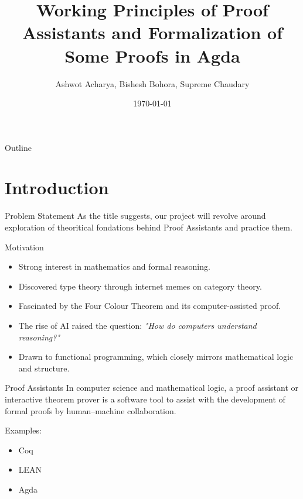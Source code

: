 \documentclass{beamer}
\title{Working Principles of Proof Assistants and Formalization of Some Proofs in Agda}
\author{Ashwot Acharya, Bishesh Bohora, Supreme Chaudary}
\institute{Kathmandu University}
\date{\today}
\begin{document}
\begin{frame}
  \titlepage
\end{frame}

\begin{frame}{Outline}
  \tableofcontents
\end{frame}

\section{Introduction}

\begin{frame}{Problem Statement}
    As the title suggests, our project will revolve around exploration of theoritical fondations behind Proof Assistants and practice them.

    
\end{frame}
\begin{frame}{Motivation}
    \begin{itemize}
  \item Strong interest in mathematics and formal reasoning.
  \item Discovered type theory through internet memes on category theory.
  \item Fascinated by the Four Colour Theorem and its computer-assisted proof.
  \item The rise of AI raised the question: \textit{"How do computers understand reasoning?"}
  \item Drawn to functional programming, which closely mirrors mathematical logic and structure.
    
\end{itemize}

\end{frame}
\begin{frame}{Proof Assistants}
        In computer science and mathematical logic, a proof assistant or interactive theorem prover is a software tool to assist with the development of formal proofs by human–machine collaboration.\cite{wikipedia_proof_assistant} 

        Examples:
        \begin{itemize}
            \item Coq
            \item LEAN 
            \item Agda
        \end{itemize}
\end{frame}
\end{document}
